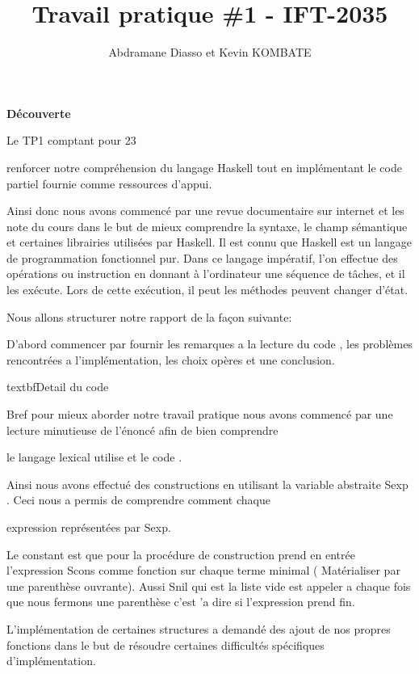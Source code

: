 \documentclass{article}
\title{Travail pratique \#1 - IFT-2035}
\author{Abdramane Diasso et Kevin KOMBATE }
\begin{document}
\maketitle

\newpage

\textbf{Découverte}

Le TP1 comptant pour 23 %

renforcer notre compréhension du langage Haskell tout en implémentant  le code partiel fournie comme ressources d’appui.

Ainsi donc nous avons commencé par une revue documentaire sur internet et les note du cours dans le but de mieux comprendre la syntaxe, le champ sémantique et certaines librairies utilisées par Haskell.                                                                                         Il est connu que Haskell est un langage de programmation fonctionnel pur. Dans ce langage impératif, l'on effectue des opérations ou instruction en donnant à l’ordinateur une séquence de tâches, et il les exécute. Lors de cette exécution, il peut les méthodes peuvent changer d’état.

Nous allons structurer notre rapport de la façon suivante:

D'abord commencer par fournir les remarques a la lecture du code , les problèmes rencontrées a l'implémentation, les choix opères et une conclusion.

 

textbf{Detail du code } 

Bref pour mieux aborder notre travail pratique nous avons commencé  par une lecture minutieuse de l'énoncé afin de bien comprendre 

le langage lexical utilise et le code .

Ainsi nous avons effectué des constructions en utilisant la variable abstraite Sexp . Ceci nous a permis de comprendre comment chaque 

expression représentées par Sexp.

Le constant est que pour la procédure de construction prend en entrée l’expression Scons comme fonction sur chaque terme minimal ( Matérialiser par une parenthèse ouvrante). Aussi Snil qui est la liste vide est appeler a chaque fois que nous fermons une parenthèse c'est 'a dire si l'expression prend fin.

L'implémentation de certaines structures a demandé des ajout de nos propres fonctions dans le but de résoudre certaines difficultés spécifiques d'implémentation.
\end{document}
